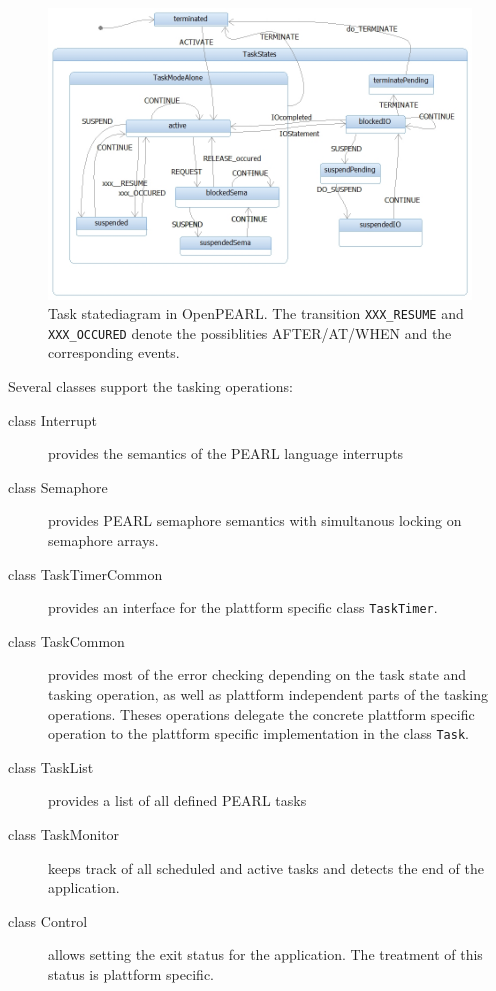 \begin{figure}[bpht]
\includegraphics[width=14cm]{taskStatesOpenPEARL.jpg}
\caption{Task statediagram in OpenPEARL.
The transition \texttt{XXX\_RESUME} and \texttt{XXX\_OCCURED} denote 
the possiblities AFTER/AT/WHEN and the corresponding events.}
\label{taskStatesOpenPEARL}
\end{figure}

Several classes support the tasking operations:
\begin{description}
\item[class Interrupt] provides the semantics of the PEARL language interrupts
\item[class Semaphore] provides PEARL semaphore semantics with simultanous
   locking on semaphore arrays.
\item[class TaskTimerCommon] provides an interface for the plattform
   specific class \verb|TaskTimer|. 
\item[class TaskCommon] provides most of the error checking depending on
   the task state and tasking operation, as well as plattform independent
   parts of the tasking operations. Theses operations delegate the concrete
   plattform specific operation to the plattform specific implementation
   in the class \verb|Task|.
\item[class TaskList] provides a list of all defined PEARL tasks
\item[class TaskMonitor] keeps track of all scheduled and active tasks and
   detects the end of the application.
\item[class Control] allows setting the exit status for the application. 
  The treatment of this status is plattform specific.
\end{description}

